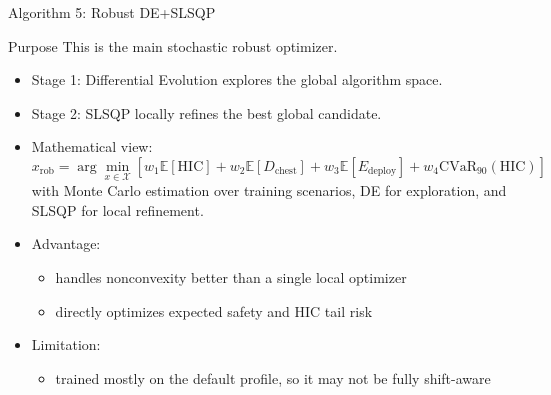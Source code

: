 \documentclass[aspectratio=169]{beamer}
\begin{document}
\begin{frame}{Algorithm 5: Robust DE+SLSQP}
  \small
  \begin{block}{Purpose}
    This is the main stochastic robust optimizer.
  \end{block}

  \begin{itemize}
    \item Stage 1: Differential Evolution explores the global algorithm space.
    \item Stage 2: SLSQP locally refines the best global candidate.
    \item Mathematical view:
    \[
    x_{\mathrm{rob}}
    =
    \arg\min_{x \in \mathcal{X}}
    \left[
    w_1 \mathbb{E}[\mathrm{HIC}]
    + w_2 \mathbb{E}[D_{\mathrm{chest}}]
    + w_3 \mathbb{E}[E_{\mathrm{deploy}}]
    + w_4 \mathrm{CVaR}_{90}(\mathrm{HIC})
    \right]
    \]
    with Monte Carlo estimation over training scenarios, DE for exploration, and SLSQP for local refinement.
    \item Advantage:
    \begin{itemize}
      \item handles nonconvexity better than a single local optimizer
      \item directly optimizes expected safety and HIC tail risk
    \end{itemize}
    \item Limitation:
    \begin{itemize}
      \item trained mostly on the default profile, so it may not be fully shift-aware
    \end{itemize}
  \end{itemize}
\end{frame}

\end{document}
